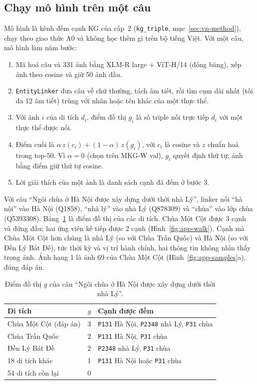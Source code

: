 \subsection{Chạy mô hình trên một câu}\label{app:vn-run}

Mô hình là kênh đếm cạnh KG của cấp~2 (\texttt{kg\_triple}, mục~\ref{sec:vn-method}), chạy theo giao thức A0 và
không học thêm gì trên bộ tiếng Việt. Với một câu, mô hình làm năm bước:
\begin{enumerate}
\item Mã hoá câu và 331 ảnh bằng XLM-R large + ViT-H/14 (đóng băng), xếp ảnh theo cosine và giữ 50 ảnh đầu.
\item \texttt{EntityLinker} đưa câu về chữ thường, tách âm tiết, rồi tìm cụm dài nhất (tối đa 12 âm tiết) trùng với
  nhãn hoặc tên khác của một thực thể.
\item Với ảnh $i$ của di tích $d_i$, điểm đồ thị $g_i$ là số triple nối trực tiếp $d_i$ với một thực thể được nối.
\item Điểm cuối là $\alpha\, z(c_i) + (1-\alpha)\, z(g_i)$, với $c_i$ là cosine và $z$ chuẩn hoá trong top-50.
  Vì $\alpha=0$ (chọn trên MKG-W val), $g_i$ quyết định thứ tự; ảnh bằng điểm giữ thứ tự cosine.
\item Lời giải thích của một ảnh là danh sách cạnh đã đếm ở bước 3.
\end{enumerate}

Với câu ``Ngôi chùa ở Hà Nội được xây dựng dưới thời nhà Lý'', linker nối ``hà nội'' vào Hà Nội (Q1858),
``nhà lý'' vào nhà Lý (Q878309) và ``chùa'' vào lớp chùa (Q5393308). Bảng~\ref{tab:app-walk} là điểm đồ thị của
các di tích. Chùa Một Cột được 3 cạnh và đứng đầu; hai ứng viên kế tiếp được 2 cạnh
(Hình~\ref{fig:app-walk}). Cạnh mà Chùa Một Cột hơn chúng là nhà Lý (so với Chùa Trấn Quốc) và Hà Nội (so với Đền
Lý Bát Đế), tức thời kỳ và vị trí hành chính, hai thông tin không nhìn thấy trong ảnh. Ảnh hạng 1 là ảnh 69 của
Chùa Một Cột (Hình~\ref{fig:app-samples}a), đúng đáp án.

\begin{table}[!htb]
\centering
\caption{Điểm đồ thị $g$ của câu ``Ngôi chùa ở Hà Nội được xây dựng dưới thời nhà Lý''.}
\label{tab:app-walk}
\footnotesize
\setlength{\tabcolsep}{3pt}
\begin{tabular}{@{}lc>{\raggedright\arraybackslash}p{3.7cm}@{}}
\toprule
Di tích & $g$ & Cạnh được đếm \\
\midrule
Chùa Một Cột (đáp án) & 3 & \texttt{P131} Hà Nội, \texttt{P2348} nhà Lý, \texttt{P31} chùa \\
Chùa Trấn Quốc & 2 & \texttt{P131} Hà Nội, \texttt{P31} chùa \\
Đền Lý Bát Đế & 2 & \texttt{P2348} nhà Lý, \texttt{P31} chùa \\
18 di tích khác & 1 & \texttt{P131} Hà Nội hoặc \texttt{P31} chùa \\
54 di tích còn lại & 0 & \\
\bottomrule
\end{tabular}
\end{table}

